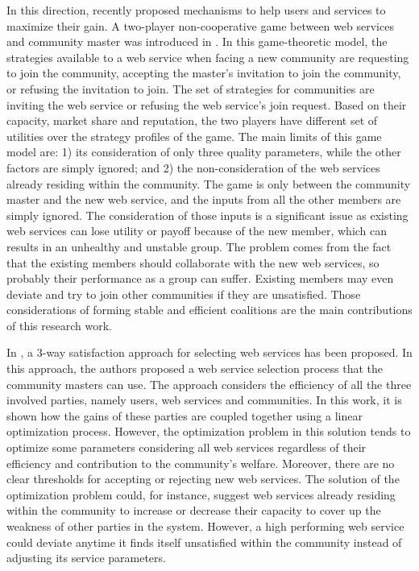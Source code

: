         In this direction, recently \cite{DBLP:conf/IEEEscc/LimTMB12,
        DBLP:conf/IEEEscc/KhosravifarABT11, 10.1109/TSC.2012.12} proposed mechanisms to help
        users and services to maximize their gain. A two-player
        non-cooperative game between web services and community master was
        introduced in \cite{DBLP:conf/IEEEscc/KhosravifarABT11}. In this
        game-theoretic model, the strategies available to a web service
        when facing a new community are requesting to join the community,
        accepting the master's invitation to join the community, or
        refusing the invitation to join. The set of strategies for
        communities are inviting the web service or refusing the web
        service's join request. Based on their capacity, market share and
        reputation, the two players have different set of utilities over
        the strategy profiles of the game. The main limits of this game
        model are: 1) its consideration of only three quality parameters,
        while the other factors are simply ignored; and 2) the
        non-consideration of the web services already residing within the
        community. The game is only between the community master and the
        new web service, and the inputs from all the other members are
        simply ignored. The consideration of those inputs is a significant
        issue as existing web services can lose utility or payoff because
        of the new member, which can results in an unhealthy and unstable
        group. The problem comes from the fact that the existing members
        should collaborate with the new web services, so probably their
        performance as a group can suffer. Existing members may even
        deviate and try to join other communities if they are unsatisfied.
        Those considerations of forming stable and efficient coalitions
        are the main contributions of this research work.

        In \cite{DBLP:conf/IEEEscc/LimTMB12}, a 3-way satisfaction approach
        for selecting web services has been proposed. In this approach,
        the authors proposed a web service selection process that the
        community masters can use. The approach considers the efficiency
        of all the three involved parties, namely users, web services and
        communities. In this work, it is shown how the gains of these
        parties are coupled together using a linear optimization process.
        However, the optimization problem in this solution tends to
        optimize some parameters considering all web services regardless
        of their efficiency and contribution to the community's welfare.
        Moreover, there are no clear thresholds for accepting or rejecting
        new web services. The solution of the optimization problem could,
        for instance, suggest web services already residing within the
        community to increase or decrease their capacity to cover up the
        weakness of other parties in the system. However, a high
        performing web service could deviate anytime it finds itself
        unsatisfied within the community instead of adjusting its service
        parameters.

